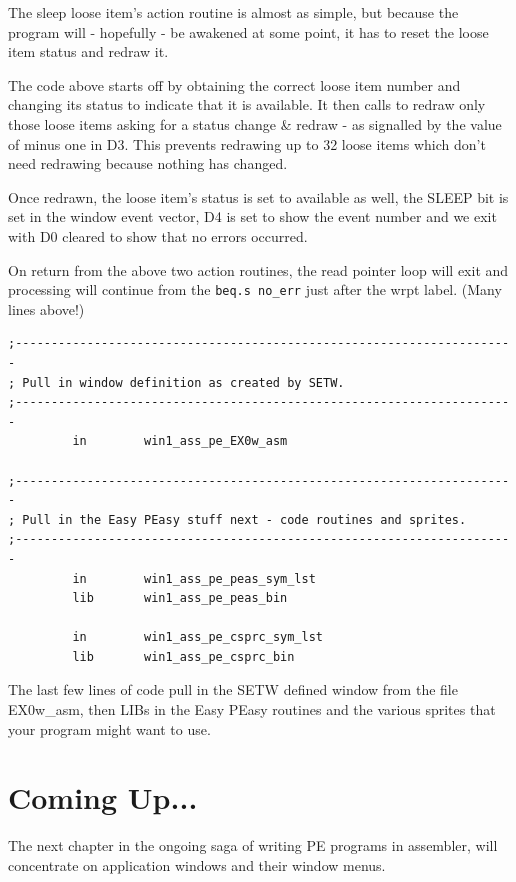 The sleep loose item's action routine is almost as simple, but because the
        program will -{} hopefully -{} be awakened at some point, it has to reset the loose
        item status and redraw it.

The code above starts off by obtaining the correct loose item number and
        changing its status to indicate that it is available. It then calls  to
        redraw only those loose items asking for a status change \& redraw -{} as
        signalled by the value of minus one in D3. This prevents redrawing up to 32 loose
        items which don't need redrawing because nothing has changed.

Once redrawn, the loose item's status is set to available as well, the SLEEP
        bit is set in the window event vector, D4 is set to show the event number and we
        exit with D0 cleared to show that no errors occurred.

On return from the above two action routines, the read pointer loop will
        exit and processing will continue from the \lstinline{beq.s no_err} just after the wrpt
        label. (Many lines above!)

\begin{lstlisting}[firstnumber=305,caption={Ex0 - Includes and Libraries}]
;----------------------------------------------------------------------
; Pull in window definition as created by SETW.
;----------------------------------------------------------------------
         in        win1_ass_pe_EX0w_asm

;----------------------------------------------------------------------
; Pull in the Easy PEasy stuff next - code routines and sprites.
;----------------------------------------------------------------------
         in        win1_ass_pe_peas_sym_lst
         lib       win1_ass_pe_peas_bin

         in        win1_ass_pe_csprc_sym_lst
         lib       win1_ass_pe_csprc_bin
\end{lstlisting}

The last few lines of code pull in the SETW defined window from the file
        EX0w\_asm, then LIBs in the Easy PEasy routines and the various sprites that your
        program might want to use.

\section{Coming Up...}

The next chapter in the ongoing saga of writing PE
        programs in assembler, will concentrate on application windows and their
        window menus.

